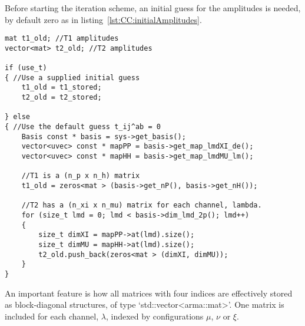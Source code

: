 Before starting the iteration scheme, an initial guess for the amplitudes is needed, by default zero as in listing~\ref{lst:CC:initialAmplitudes}.
\begin{lstlisting}[float,label=lst:CC:initialAmplitudes,caption={An initial guess for the amplitudes is needed before doing iterations. By default all amplitudes are zero, unless another starting point is supplied in `t1\_stored' and `t2\_stored' at the same time as the switch `use\_t' is set to true. Amplitudes, $t_{ij}^{ab}$, are stored as one matrix for each channel, $\lambda$, $\left.t_{(\lambda)}\right._{\mu}^{\xi}$.\vspace{2mm}}]
mat t1_old; //T1 amplitudes
vector<mat> t2_old; //T2 amplitudes

if (use_t)
{ //Use a supplied initial guess
	t1_old = t1_stored;
    t2_old = t2_stored;
    
} else
{ //Use the default guess t_ij^ab = 0    
	Basis const * basis = sys->get_basis();
    vector<uvec> const * mapPP = basis->get_map_lmdXI_de();
    vector<uvec> const * mapHH = basis->get_map_lmdMU_lm();
    
    //T1 is a (n_p x n_h) matrix
    t1_old = zeros<mat > (basis->get_nP(), basis->get_nH());
    
    //T2 has a (n_xi x n_mu) matrix for each channel, lambda.
    for (size_t lmd = 0; lmd < basis->dim_lmd_2p(); lmd++)
    {
    	size_t dimXI = mapPP->at(lmd).size();
        size_t dimMU = mapHH->at(lmd).size();
        t2_old.push_back(zeros<mat > (dimXI, dimMU));
	}
}
\end{lstlisting}
An important feature is how all matrices with four indices are effectively stored as block-diagonal structures, of type `std::vector\textless arma::mat\textgreater'.
One matrix is included for each channel, $\lambda$, indexed by configurations $\mu$, $\nu$ or $\xi$.

